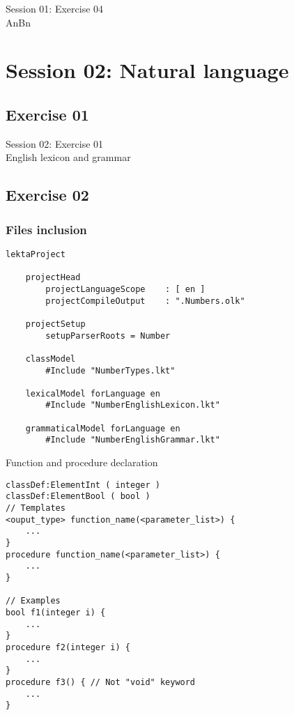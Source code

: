 \documentclass[11pt]{beamer}
\begin{document}
\begin{frame}[fragile]
\Huge
\begin{center}
Session 01: Exercise 04\\
AnBn
\end{center}
\end{frame}

\section{Session 02: Natural language}

\subsection{Exercise 01}

\begin{frame}[fragile]
\Huge
\begin{center}
Session 02: Exercise 01\\
English lexicon and grammar
\end{center}
\end{frame}

\subsection{Exercise 02}

\begin{frame}[fragile]
\frametitle{Files inclusion}
\footnotesize
\begin{lstlisting}[language=lekta]
lektaProject
	
	projectHead
		projectLanguageScope	: [ en ]
		projectCompileOutput	: ".Numbers.olk"

	projectSetup
		setupParserRoots = Number

	classModel
		#Include "NumberTypes.lkt"

	lexicalModel forLanguage en
		#Include "NumberEnglishLexicon.lkt"

	grammaticalModel forLanguage en
		#Include "NumberEnglishGrammar.lkt"
\end{lstlisting}
\end{frame}

\begin{frame}[fragile]
\begin{block}{Function and procedure declaration}
\scriptsize
\begin{lstlisting}[language=lekta]
classDef:ElementInt ( integer )
classDef:ElementBool ( bool )
// Templates
<ouput_type> function_name(<parameter_list>) {
	...
}
procedure function_name(<parameter_list>) {
	...
}

// Examples
bool f1(integer i) {
	...
}
procedure f2(integer i) {
	...
}
procedure f3() { // Not "void" keyword
	...
}
\end{lstlisting}
\end{block}
\end{frame}
\end{document}
